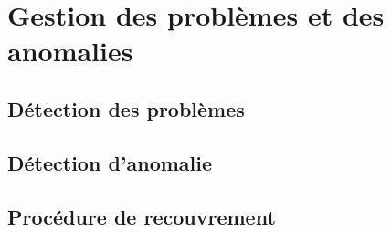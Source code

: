 \section{Gestion des problèmes et des anomalies}

\subsection{Détection des problèmes}

\subsection{Détection d'anomalie}

\subsection{Procédure de recouvrement}

